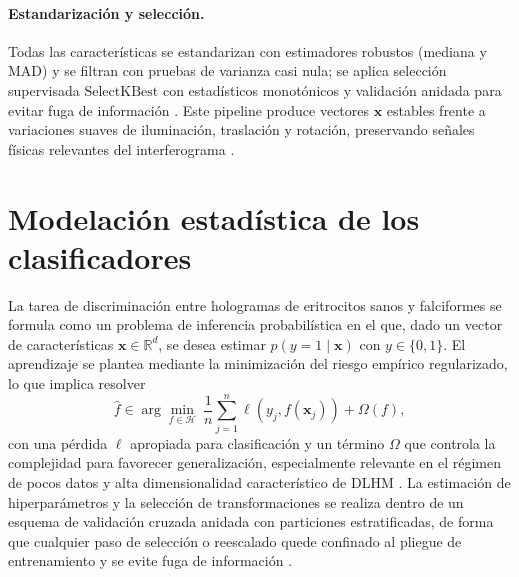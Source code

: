 \paragraph{Estandarización y selección.}
Todas las características se estandarizan con estimadores robustos (mediana y MAD) y se filtran con pruebas de varianza casi nula; se aplica selección supervisada \(\mathrm{SelectKBest}\) con estadísticos monotónicos y validación anidada para evitar fuga de información \cite{Tsamardinos2022}. Este pipeline produce vectores \(\mathbf{x}\) estables frente a variaciones suaves de iluminación, traslación y rotación, preservando señales físicas relevantes del interferograma \cite{Amann2019,OConnor2020,BuitragoDuque2023}.
\section{Modelación estadística de los clasificadores}

La tarea de discriminación entre hologramas de eritrocitos sanos y falciformes se formula como un problema de inferencia probabilística en el que, dado un vector de características \(\mathbf{x}\in\mathbb{R}^{d}\), se desea estimar \(p(y=1\mid\mathbf{x})\) con \(y\in\{0,1\}\). El aprendizaje se plantea mediante la minimización del riesgo empírico regularizado, lo que implica resolver
\begin{equation}
\hat f \in \arg\min_{f\in\mathcal{H}} \ \frac{1}{n}\sum_{j=1}^{n}\ell\!\left(y_{j},f(\mathbf{x}_{j})\right)+\Omega(f),
\label{eq:erm}
\end{equation}
con una pérdida \(\ell\) apropiada para clasificación y un término \(\Omega\) que controla la complejidad para favorecer generalización, especialmente relevante en el régimen de pocos datos y alta dimensionalidad característico de DLHM \cite{Tsamardinos2022,Vabalas2019}. La estimación de hiperparámetros y la selección de transformaciones se realiza dentro de un esquema de validación cruzada anidada con particiones estratificadas, de forma que cualquier paso de selección o reescalado quede confinado al pliegue de entrenamiento y se evite fuga de información \cite{Tsamardinos2022,Vabalas2019}.

